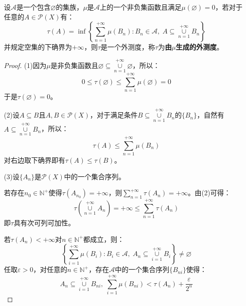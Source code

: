 \begin{theorem}
	设$\mathscr{A}$是一个包含$\varnothing$的集族，$\mu$是$\mathscr{A}$上的一个非负集函数且满足$\mu(\varnothing)=0$，若对于任意的$A\in\mathscr{P}(X)$有：
	\begin{equation*}
		\tau(A)=\inf\left\{\sum_{n=1}^{+\infty}\mu(B_n):B_n\in\mathscr{A},\;A\subseteq\underset{n=1}{\overset{+\infty}{\cup}}B_n\right\}
	\end{equation*}
	并规定空集的下确界为$+\infty$，则$\tau$是一个外测度，称$\tau$为\textbf{由$\mu$生成的外测度}。
\end{theorem}
\begin{proof}
	(1)因为$\mu$是非负集函数且$\varnothing\subseteq\underset{n=1}{\overset{+\infty}{\cup}}\varnothing$，所以：
	\begin{equation*}
		0\leqslant\tau(\varnothing)\leqslant\sum_{n=1}^{+\infty}\mu(\varnothing)=0
	\end{equation*}
	于是$\tau(\varnothing)=0$。\par
	(2)设$A\subseteq B$且$A,B\in\mathscr{P}(X)$，对于满足条件$B\subseteq\underset{n=1}{\overset{+\infty}{\cup}}B_n$的$\{B_n\}$，自然有$A\subseteq\underset{n=1}{\overset{+\infty}{\cup}}B_n$，所以：
	\begin{equation*}
		\tau(A)\leqslant\sum_{n=1}^{+\infty}\mu(B_n)
	\end{equation*}
	对右边取下确界即有$\tau(A)\leqslant\tau(B)$。\par
	(3)设$\{A_n\}$是$\mathscr{P}(X)$中的一个集合序列。\par
	若存在$n_0\in\mathbb{N}^+$使得$\tau(A_{n_0})=+\infty$，则$\sum\limits_{n=1}^{+\infty}\tau(A_n)=+\infty$。由(2)可得：
	\begin{equation*}
		\tau\left(\underset{n=1}{\overset{+\infty}{\cup}}A_n\right)=+\infty\leqslant\sum\limits_{n=1}^{+\infty}\tau(A_n)
	\end{equation*}
	即$\tau$具有次可列可加性。\par
	若$\tau(A_n)<+\infty$对$n\in\mathbb{N}^+$都成立，则：
	\begin{equation*}
		\left\{\sum_{i=1}^{+\infty}\mu(B_i):B_i\in\mathscr{A},\;A_n\subseteq\underset{i=1}{\overset{+\infty}{\cup}}B_i\right\}\ne\varnothing
	\end{equation*}
	任取$\varepsilon>0$，对任意的$n\in\mathbb{N}^+$，存在$\mathscr{A}$中的一个集合序列$\{B_{ni}\}$使得：
	\begin{equation*}
		A_n\subseteq\underset{i=1}{\overset{+\infty}{\cup}}B_{ni},\;
		\sum_{i=1}^{+\infty}\mu(B_{ni})<\tau(A_n)+\frac{\varepsilon}{2^n}
	\end{equation*}

\end{proof}
